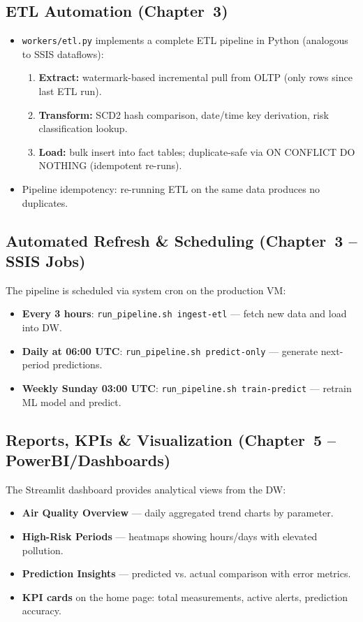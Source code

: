 \documentclass[11pt,a4paper]{article}
\begin{document}
\subsection{ETL Automation (Chapter~3)}

\begin{itemize}[nosep]
  \item \texttt{workers/etl.py} implements a complete ETL pipeline in Python (analogous to SSIS dataflows):
  \begin{enumerate}[nosep]
    \item \textbf{Extract:} watermark-based incremental pull from OLTP (only rows since last ETL run).
    \item \textbf{Transform:} SCD2 hash comparison, date/time key derivation, risk classification lookup.
    \item \textbf{Load:} bulk insert into fact tables; duplicate-safe via ON CONFLICT DO NOTHING (idempotent re-runs).
  \end{enumerate}
  \item Pipeline idempotency: re-running ETL on the same data produces no duplicates.
\end{itemize}

\subsection{Automated Refresh \& Scheduling (Chapter~3 -- SSIS Jobs)}

The pipeline is scheduled via system cron on the production VM:
\begin{itemize}[nosep]
  \item \textbf{Every 3 hours}: \texttt{run\_pipeline.sh ingest-etl} --- fetch new data and load into DW.
  \item \textbf{Daily at 06:00 UTC}: \texttt{run\_pipeline.sh predict-only} --- generate next-period predictions.
  \item \textbf{Weekly Sunday 03:00 UTC}: \texttt{run\_pipeline.sh train-predict} --- retrain ML model and predict.
\end{itemize}

\subsection{Reports, KPIs \& Visualization (Chapter~5 -- PowerBI/Dashboards)}

The Streamlit dashboard provides analytical views from the DW:
\begin{itemize}[nosep]
  \item \textbf{Air Quality Overview} --- daily aggregated trend charts by parameter.
  \item \textbf{High-Risk Periods} --- heatmaps showing hours/days with elevated pollution.
  \item \textbf{Prediction Insights} --- predicted vs. actual comparison with error metrics.
  \item \textbf{KPI cards} on the home page: total measurements, active alerts, prediction accuracy.
\end{itemize}
\end{document}
